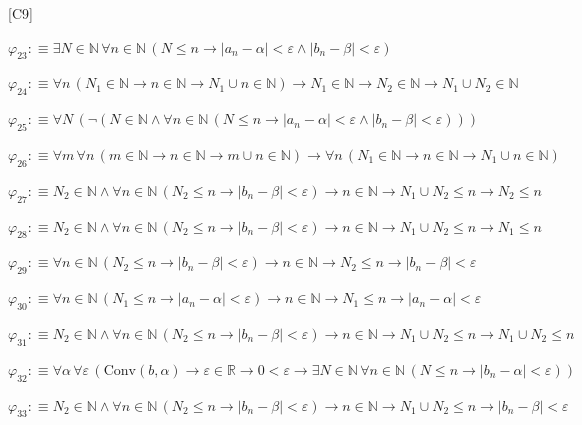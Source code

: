 \begin{fullproof}{[C9]}
\begin{abbrevlist}
\item $\varphi_{23} :\equiv \exists N \in \mathbb{N}\,\forall n \in \mathbb{N}\,(N \leq n \to \lvert a_{n} - \alpha \rvert < \varepsilon \land \lvert b_{n} - \beta \rvert < \varepsilon)$
\item $\varphi_{24} :\equiv \forall n\,(N_{1} \in \mathbb{N} \to n \in \mathbb{N} \to N_{1} \cup n \in \mathbb{N}) \to N_{1} \in \mathbb{N} \to N_{2} \in \mathbb{N} \to N_{1} \cup N_{2} \in \mathbb{N}$
\item $\varphi_{25} :\equiv \forall N\,(\neg (N \in \mathbb{N} \land \forall n \in \mathbb{N}\,(N \leq n \to \lvert a_{n} - \alpha \rvert < \varepsilon \land \lvert b_{n} - \beta \rvert < \varepsilon)))$
\item $\varphi_{26} :\equiv \forall m\,\forall n\,(m \in \mathbb{N} \to n \in \mathbb{N} \to m \cup n \in \mathbb{N}) \to \forall n\,(N_{1} \in \mathbb{N} \to n \in \mathbb{N} \to N_{1} \cup n \in \mathbb{N})$
\item $\varphi_{27} :\equiv N_{2} \in \mathbb{N} \land \forall n \in \mathbb{N}\,(N_{2} \leq n \to \lvert b_{n} - \beta \rvert < \varepsilon) \to n \in \mathbb{N} \to N_{1} \cup N_{2} \leq n \to N_{2} \leq n$
\item $\varphi_{28} :\equiv N_{2} \in \mathbb{N} \land \forall n \in \mathbb{N}\,(N_{2} \leq n \to \lvert b_{n} - \beta \rvert < \varepsilon) \to n \in \mathbb{N} \to N_{1} \cup N_{2} \leq n \to N_{1} \leq n$
\item $\varphi_{29} :\equiv \forall n \in \mathbb{N}\,(N_{2} \leq n \to \lvert b_{n} - \beta \rvert < \varepsilon) \to n \in \mathbb{N} \to N_{2} \leq n \to \lvert b_{n} - \beta \rvert < \varepsilon$
\item $\varphi_{30} :\equiv \forall n \in \mathbb{N}\,(N_{1} \leq n \to \lvert a_{n} - \alpha \rvert < \varepsilon) \to n \in \mathbb{N} \to N_{1} \leq n \to \lvert a_{n} - \alpha \rvert < \varepsilon$
\item $\varphi_{31} :\equiv N_{2} \in \mathbb{N} \land \forall n \in \mathbb{N}\,(N_{2} \leq n \to \lvert b_{n} - \beta \rvert < \varepsilon) \to n \in \mathbb{N} \to N_{1} \cup N_{2} \leq n \to N_{1} \cup N_{2} \leq n$
\item $\varphi_{32} :\equiv \forall \alpha\,\forall \varepsilon\,(\mathrm{Conv}(b,\alpha) \to \varepsilon \in \mathbb{R} \to 0 < \varepsilon \to \exists N \in \mathbb{N}\,\forall n \in \mathbb{N}\,(N \leq n \to \lvert b_{n} - \alpha \rvert < \varepsilon))$
\item $\varphi_{33} :\equiv N_{2} \in \mathbb{N} \land \forall n \in \mathbb{N}\,(N_{2} \leq n \to \lvert b_{n} - \beta \rvert < \varepsilon) \to n \in \mathbb{N} \to N_{1} \cup N_{2} \leq n \to \lvert b_{n} - \beta \rvert < \varepsilon$

\end{abbrevlist}
\end{fullproof}
